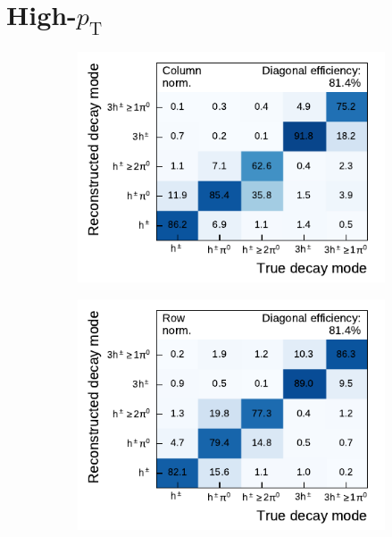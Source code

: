 \clearpage
\section{High-$p_\text{T}$}
\label{sec:combined_high_pt_migration}

\begin{figure}[htb]
    \begin{subfigure}{0.48\textwidth}
    \centering
    \includegraphics{./figures/decay_mode_classification/highpt/mig_mat_pt_less_100.pdf}
  \end{subfigure}\hfill
  \begin{subfigure}{0.48\textwidth}
    \centering
    \includegraphics{./figures/decay_mode_classification/highpt/comp_mat_pt_less_100.pdf}

\end{subfigure}
\end{figure}
